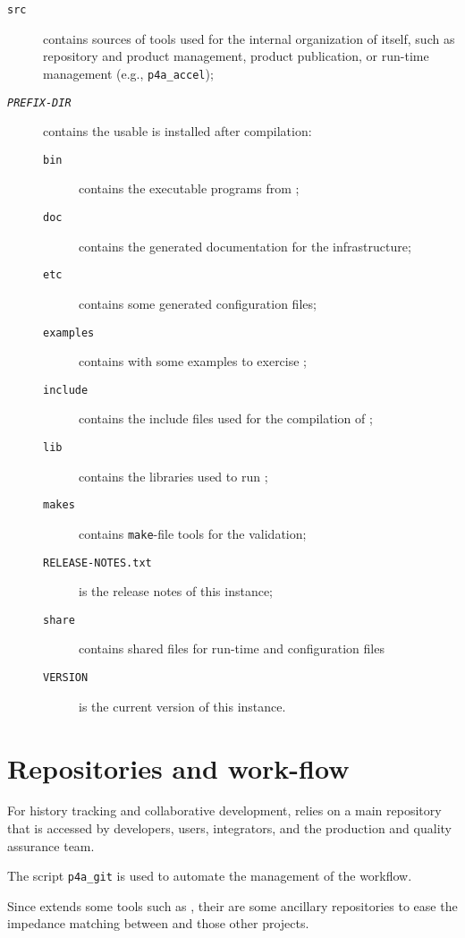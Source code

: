 \documentclass[a4paper]{article}
\begin{document}
\begin{description}
\item[\texttt{src}] contains sources of tools used for the internal
  organization of \Apfa itself, such as repository and product management,
  product publication, or run-time management (e.g., \verb|p4a_accel|);
\item[\texttt{\emph{PREFIX-DIR}}] contains the usable \Apfa is installed
  after compilation:
  \begin{description}
  \item[\texttt{bin}] contains the executable programs from \Apfa;
  \item[\texttt{doc}] contains the generated documentation for the \Apfa
    infrastructure;
  \item[\texttt{etc}] contains some generated configuration files;
  \item[\texttt{examples}] contains with some examples to exercise \Apfa;
  \item[\texttt{include}] contains the include files used for the
    compilation of \Apfa;
  \item[\texttt{lib}] contains the libraries used to run \Apfa;
  \item[\texttt{makes}] contains \texttt{make}-file tools for the
    \Apips validation;
  \item[\texttt{RELEASE-NOTES.txt}] is the release notes of this \Apfa
    instance;
  \item[\texttt{share}] contains shared files for run-time and
    configuration files
  \item[\texttt{VERSION}] is the current version of this \Apfa
    instance.
  \end{description}
\end{description}


\section{Repositories and work-flow}
\label{sec:repos-workfl}

For history tracking and collaborative development, \Apfa relies on a main
\Agit repository that is accessed by \Apfa developers, users, integrators,
and the production and quality assurance team.

The script \verb|p4a_git| is used to automate the management of the
workflow.

Since \Apfa extends some tools such as \Apips, their are some
ancillary repositories to ease the impedance matching between \Apfa and
those other projects.
\end{document}
